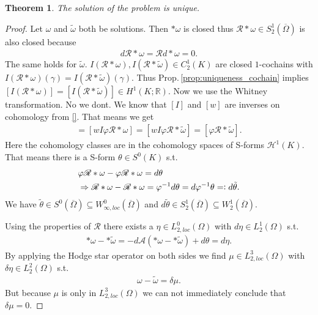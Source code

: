 \documentclass[12pt,a4paper]{article}
\numberwithin{equation}{subsection}
\numberwithin{lemma}{subsection}
\newtheorem{theorem}[lemma]{Theorem}
\theoremstyle{definition}
\newcommand{\aop}{\mathscr{A}}
\newcommand{\omegabar}{\overline{\Omega}}
\newcommand{\real}{\mathbb{R}}
\newcommand{\rop}{\mathscr{R}} %
\begin{document}
\begin{theorem}
    The solution of the problem is unique.
\end{theorem}
\begin{proof}
    Let $\omega$ and $\tilde{\omega}$ both be solutions. Then $*\omega$ is 
    closed thus $\rop *\omega \in S_2^1(\omegabar)$ is also closed because 
    \begin{align*}
        d \rop * \omega = \rop d*\omega = 0.
    \end{align*}
    The same 
    holds for $\tilde{\omega}$. 
    $I(\rop * \omega), I(\rop * \tilde{\omega}) \in C^1_2(K)$ 
    are closed $1$-cochains with
    $I(\rop * \omega)(\gamma) = I(\rop * \tilde{\omega})(\gamma)$. 
    Thus Prop.\,\ref{prop:uniqueness_cochain} implies 
    $[I(\rop * \omega)] = [I(\rop * \tilde{\omega})] \in H^1(K;\real)$.
    Now we use the Whitney transformation. {\color{red} No we dont.} 
    We know that $[I]$ and $[w]$ are 
    inverses on cohomology from \ref{}. That means we get 
    \begin{align*}
        [\varphi \rop *\omega] = [wI\varphi \rop *\omega] 
        = [wI\varphi \rop *\tilde{\omega}] = [\varphi \rop *\tilde{\omega}].
    \end{align*}
    Here the cohomology classes are in the cohomology spaces of S-forms 
    $\mathscr{H}^1(K)$. That means there is a S-form $\theta \in S^0(K)$ s.t.
    \begin{align*}
        &\varphi \rop *\omega - \varphi \rop *\omega = d\theta \\ 
        &\Rightarrow \rop *\omega -  \rop *\omega = \varphi^{-1} d\theta 
        = d\varphi^{-1}\theta =\vcentcolon d\tilde{\theta}.
    \end{align*}
    We have $\tilde{\theta} \in S^0(\omegabar) \subseteq 
    W_{\infty,loc}^0(\omegabar)$ and $d \tilde{\theta} \in S_2^1(\omegabar)
    \subseteq W_2^1(\omegabar)$.

    Using the 
    properties of $\rop$ there exists a $\eta \in L_{2,loc}^0(\Omega)$
    with $d\eta \in L^1_2(\Omega)$ s.t. 
    \begin{align*}
        *\omega - *\tilde{\omega} = -d\aop(*\omega - *\tilde{\omega})
        + d \theta = d\eta.
    \end{align*}
    By applying the Hodge star operator on both sides we find 
    $\mu \in L_{2,loc}^3(\Omega)$ with $\delta \eta \in L^2_2(\Omega)$ s.t.
    \begin{align}
        \omega - \tilde{\omega} = \delta \mu. \label{difference_solutions}
    \end{align}
    But because $\mu$ is only in $L_{2,loc}^3(\Omega)$ 
    we can not immediately conclude that $\delta \mu = 0$.


\end{proof}
\end{document}
